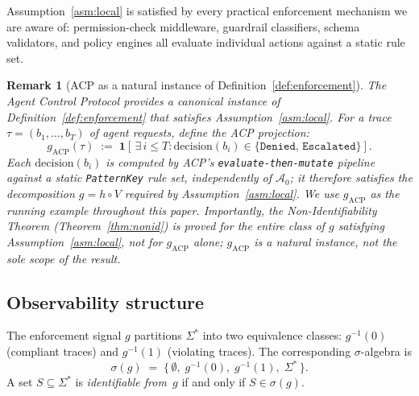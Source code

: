 \documentclass[11pt]{article}
\newtheorem{remark}{Remark}[section]
\newcommand{\Sigstar}{\Sigma^{*}}
\newcommand{\Azero}{\mathcal{A}_0}
\newcommand{\sigg}{\sigma(g)}
\begin{document}
Assumption~\ref{asm:local} is satisfied by every practical enforcement
mechanism we are aware of: permission-check middleware, guardrail classifiers,
schema validators, and policy engines all evaluate individual actions against
a static rule set.

\begin{remark}[ACP as a natural instance of Definition~\ref{def:enforcement}]
\label{rem:acp-instance}
The Agent Control Protocol \citep{fernandez2026acp} provides a canonical
instance of Definition~\ref{def:enforcement} that satisfies
Assumption~\ref{asm:local}.  For a trace $\tau = (b_1,\ldots,b_T)$ of
agent requests, define the ACP projection:
\[
  g_{\mathrm{ACP}}(\tau)
  \;:=\;
  \mathbf{1}\!\left[\,\exists\,i \leq T :
    \mathrm{decision}(b_i) \in \{\texttt{Denied},\,\texttt{Escalated}\}
  \right].
\]
Each $\mathrm{decision}(b_i)$ is computed by ACP's
\texttt{evaluate-then-mutate} pipeline against a static
\texttt{PatternKey} rule set, independently of $\Azero$; it therefore
satisfies the decomposition $g = h \circ V$ required by
Assumption~\ref{asm:local}.
We use $g_{\mathrm{ACP}}$ as the running example throughout this paper.
Importantly, the Non-Identifiability Theorem (Theorem~\ref{thm:nonid}) is
proved for the \emph{entire class} of $g$ satisfying
Assumption~\ref{asm:local}, not for $g_{\mathrm{ACP}}$ alone; $g_{\mathrm{ACP}}$
is a natural \emph{instance}, not the sole scope of the result.
\end{remark}

\subsection{Observability structure}

The enforcement signal $g$ partitions $\Sigstar$ into two equivalence classes:
$g^{-1}(0)$ (compliant traces) and $g^{-1}(1)$ (violating traces).  The
corresponding $\sigma$-algebra is
\[
  \sigg \;=\; \bigl\{\,\emptyset,\; g^{-1}(0),\; g^{-1}(1),\; \Sigstar\,\bigr\}.
\]
A set $S \subseteq \Sigstar$ is \emph{identifiable from~$g$} if and only if
$S \in \sigg$.
\end{document}

